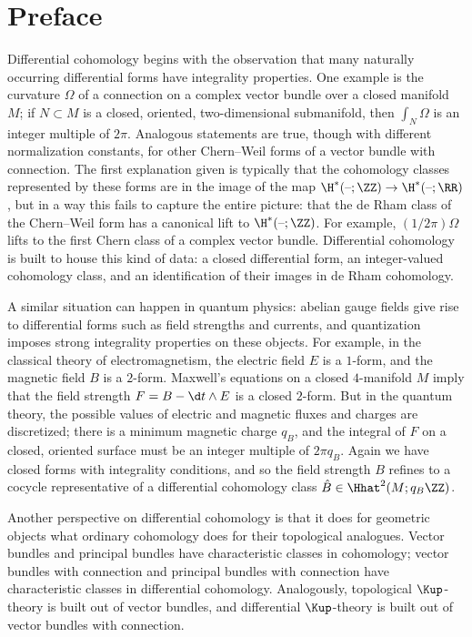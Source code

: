 
\section{Preface}
Differential cohomology begins with the observation that many naturally occurring differential forms have
integrality properties. One example is the curvature $\Omega$ of a connection on a complex vector bundle over a
closed manifold $M$; if $N\subset M$ is a closed, oriented, two-dimensional submanifold, then $\int_N \Omega$ is
an integer multiple of $2\pi$. Analogous statements are true, though with different normalization constants, for
other Chern--Weil forms of a vector bundle with connection. The first explanation given is typically that the
cohomology classes represented by these forms are in the image of the map $\H^*(\text{--};\ZZ)\to \H^*(\text{--};
\RR)$, but in a way this fails to capture the entire picture: that the de Rham class of the Chern--Weil form has a
canonical lift to $\H^*(\text{--};\ZZ)$. For example, $(1/2\pi) \Omega$ lifts to the first Chern class of a complex
vector bundle. Differential cohomology is built to house this kind of data: a closed differential form, an
integer-valued cohomology class, and an identification of their images in de Rham cohomology.

A similar situation can happen in quantum physics: abelian
gauge fields give rise to differential forms such as field strengths and currents, and quantization imposes strong
integrality properties on these objects. For example, in the classical theory of electromagnetism, the electric
field $E$ is a $1$-form, and the magnetic field $B$ is a $2$-form. Maxwell's equations on a closed $4$-manifold $M$
imply that the field strength $F = B - \d t\wedge E$ is a closed $2$-form. But
in the quantum theory, the possible values of electric and magnetic fluxes and charges are discretized; there is a
minimum magnetic charge $q_B$, and the integral of $F$ on a closed, oriented surface must be an integer multiple of
$2\pi q_B$. Again we have closed forms with integrality conditions, and so the field strength $B$ refines to a
cocycle representative of a differential cohomology class $\hat B\in\Hhat^2(M; q_B\ZZ)$.

Another perspective on differential cohomology is that it does for geometric objects what ordinary cohomology does
for their topological analogues. Vector bundles and principal bundles have characteristic classes in cohomology;
vector bundles with connection and principal bundles with connection have characteristic classes in differential
cohomology.
Analogously, topological $\Kup$-theory is built out of vector bundles, and differential
$\Kup$-theory is built out of vector bundles with connection. 

